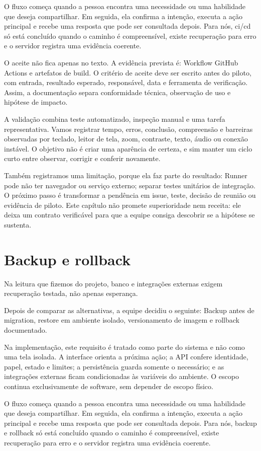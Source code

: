 \documentclass[12pt,oneside,a4paper,article]{abntex2}
\begin{document}
O fluxo começa quando a pessoa encontra uma necessidade ou uma habilidade que deseja compartilhar. Em seguida, ela confirma a intenção, executa a ação principal e recebe uma resposta que pode ser consultada depois. Para nós, ci/cd só está concluído quando o caminho é compreensível, existe recuperação para erro e o servidor registra uma evidência coerente.

O aceite não fica apenas no texto. A evidência prevista é: Workflow GitHub Actions e artefatos de build. O critério de aceite deve ser escrito antes do piloto, com entrada, resultado esperado, responsável, data e ferramenta de verificação. Assim, a documentação separa conformidade técnica, observação de uso e hipótese de impacto.

A validação combina teste automatizado, inspeção manual e uma tarefa representativa. Vamos registrar tempo, erros, conclusão, compreensão e barreiras observadas por teclado, leitor de tela, zoom, contraste, texto, áudio ou conexão instável. O objetivo não é criar uma aparência de certeza, e sim manter um ciclo curto entre observar, corrigir e conferir novamente.

Também registramos uma limitação, porque ela faz parte do resultado: Runner pode não ter navegador ou serviço externo; separar testes unitários de integração. O próximo passo é transformar a pendência em issue, teste, decisão de reunião ou evidência de piloto. Este capítulo não promete superioridade nem receita: ele deixa um contrato verificável para que a equipe consiga descobrir se a hipótese se sustenta.

\section{Backup e rollback}
Na leitura que fizemos do projeto, banco e integrações externas exigem recuperação testada, não apenas esperança.

Depois de comparar as alternativas, a equipe decidiu o seguinte: Backup antes de migration, restore em ambiente isolado, versionamento de imagem e rollback documentado.

Na implementação, este requisito é tratado como parte do sistema e não como uma tela isolada. A interface orienta a próxima ação; a API confere identidade, papel, estado e limites; a persistência guarda somente o necessário; e as integrações externas ficam condicionadas às variáveis do ambiente. O escopo continua exclusivamente de software, sem depender de escopo físico.

O fluxo começa quando a pessoa encontra uma necessidade ou uma habilidade que deseja compartilhar. Em seguida, ela confirma a intenção, executa a ação principal e recebe uma resposta que pode ser consultada depois. Para nós, backup e rollback só está concluído quando o caminho é compreensível, existe recuperação para erro e o servidor registra uma evidência coerente.
\end{document}
